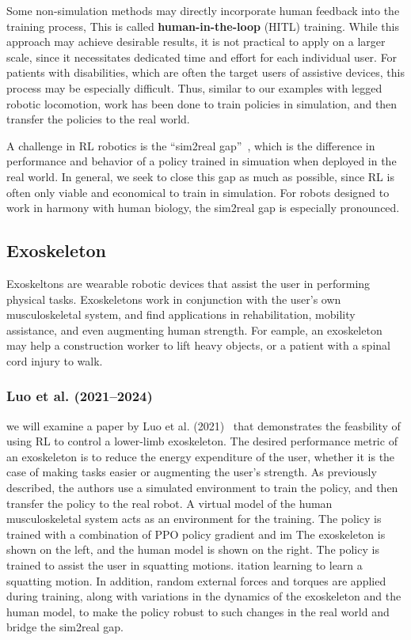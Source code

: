 \documentclass[12pt]{report}
\theoremstyle{definition}
\theoremstyle{remark}
\begin{document}
Some non-simulation methods may directly incorporate human feedback into the training process, This is called \textbf{human-in-the-loop} (HITL) training. While this approach may achieve desirable results, it is not practical to apply on a larger scale, since it necessitates dedicated time and effort for each individual user. For patients with disabilities, which are often the target users of assistive devices, this process may be especially difficult. Thus, similar to our examples with legged robotic locomotion, work has been done to train policies in simulation, and then transfer the policies to the real world.

A challenge in RL robotics is the ``sim2real gap''~\cite{luo_experiment-free_2024}, which is the difference in performance and behavior of a policy trained in simuation when deployed in the real world. In general, we seek to close this gap as much as possible, since RL is often only viable and economical to train in simulation. For robots designed to work in harmony with human biology, the sim2real gap is especially pronounced.

\subsection{Exoskeleton}
Exoskeltons are wearable robotic devices that assist the user in performing physical tasks. Exoskeletons work in conjunction with the user's own musculoskeletal system, and find applications in rehabilitation, mobility assistance, and even augmenting human strength. For eample, an exoskeleton may help a construction worker to lift heavy objects, or a patient with a spinal cord injury to walk.

\subsubsection{Luo et al. (2021--2024)}
we will examine a paper by Luo et al. (2021)~\cite{luo_reinforcement_2021} that demonstrates the feasbility of using RL to control a lower-limb exoskeleton. The desired performance metric of an exoskeleton is to reduce the energy expenditure of the user, whether it is the case of making tasks easier or augmenting the user's strength. As previously described, the authors use a simulated environment to train the policy, and then transfer the policy to the real robot. A virtual model of the human musculoskeletal system acts as an environment for the training. The policy is trained with a combination of PPO policy gradient and im The exoskeleton is shown on the left, and the human model is shown on the right. The policy is trained to assist the user in squatting motions. itation learning to learn a squatting motion. In addition, random external forces and torques are applied during training, along with variations in the dynamics of the exoskeleton and the human model, to make the policy robust to such changes in the real world and bridge the sim2real gap.
\end{document}

